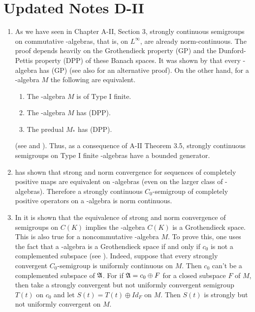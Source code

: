 \section{Updated Notes D-II}
\begin{enumerate}
\item 
As we have seen in Chapter A-II, Section 3, strongly continuous semigroups on commutative \WA-algebras, that is, on $L^{\infty}$, are already norm-continuous. 
The proof depends heavily on the Grothendieck property (GP) and the Dunford-Pettis property (DPP) of these Banach spaces. 
It was shown by  that every \WA-algebra has (GP) (see also  for an alternative proof).
On the other hand, for a \WA-algebra $M$ the following are equivalent.
\begin{enumerate}[\upshape(a)]
    \item The \WA-algebra $M$ is of Type I finite.
    \item The \WA-algebra $M$ has (DPP).
    \item The predual $M_{*}$ has (DPP).
\end{enumerate}
(see  and ).
Thus, as a consequence of A-II Theorem 3.5, strongly continuous semigroups on Type I finite \WA-algebras have a bounded generator. 

\item
{} has shown that strong and norm convergence for sequences of completely positive maps are equivalent on \WA-algebras (even on the larger class of \AW-algebras).
Therefore a strongly continuous $C_{0}$-semigroup of completely positive operators on a \WA-algebra is norm continuous.

\item 
In  it is shown that the equivalence of strong and norm convergence of semigroups on $C(K)$ implies the \CA-algebra $C(K)$ is a Grothendieck space.
This is also true for a noncommutative \CA-algebra $M$.
To prove this, one uses the fact that a \CA-algebra is a Grothendieck space if and only if $c_{0}$ is not a complemented subspace (see ).
Indeed, suppose that every strongly convergent $C_{0}$-semigroup is uniformly continuous on $M$.
Then $c_{0}$ can't be a complemented subspace of $\mathfrak{A}$.
For if $\mathfrak{A} = c_{0} \oplus F$ for a closed subspace $F$ of $M$, then take a strongly convergent but not uniformly convergent semigroup ${T(t)}$ on $c_{0}$ and let $S(t) = T(t) \oplus Id_{F}$ on $M$. 
Then ${S(t)}$ is strongly but not uniformly convergent on $M$. 
%
\end{enumerate}